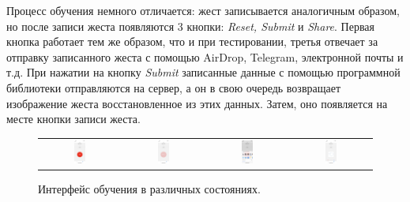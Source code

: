 Процесс обучения немного отличается: жест записывается аналогичным образом, но после записи жеста появляются 3 кнопки: \textit{Reset, Submit} и \textit{Share}. Первая кнопка работает тем же образом, что и при тестировании, третья отвечает за отправку записанного жеста с помощью AirDrop, Telegram, электронной почты и т.д. При нажатии на кнопку \textit{Submit} записанные данные с помощью программной библиотеки отправляются на сервер, а он в свою очередь возвращает изображение жеста восстановленное из этих данных. Затем, оно появляется на месте кнопки записи жеста.
\begin{figure}[H]
    \begin{center}
        \begin{tabular}{cccc}
            \includegraphics[width=0.15\textwidth]{testingapp_screenshots/IMG_2012.PNG} & 
            \includegraphics[width=0.15\textwidth]{testingapp_screenshots/IMG_2013.PNG} & 
            \includegraphics[width=0.15\textwidth]{testingapp_screenshots/IMG_2014.PNG} & 
            \includegraphics[width=0.15\textwidth]{testingapp_screenshots/IMG_2015.PNG} \\
        \end{tabular}
    \end{center}
    \caption{Интерфейс обучения в различных состояниях.}
\end{figure}